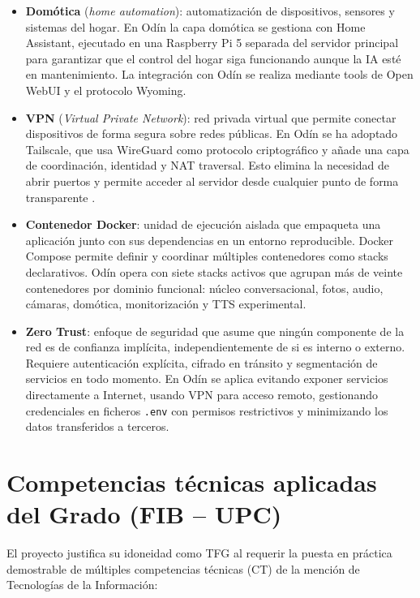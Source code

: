 \begin{itemize}
  \item \textbf{Domótica} (\textit{home automation}): automatización de dispositivos, sensores y sistemas del hogar. En Odín la capa domótica se gestiona con Home Assistant, ejecutado en una Raspberry Pi 5 separada del servidor principal para garantizar que el control del hogar siga funcionando aunque la IA esté en mantenimiento. La integración con Odín se realiza mediante tools de Open WebUI y el protocolo Wyoming.

  \item \textbf{VPN} (\textit{Virtual Private Network}): red privada virtual que permite conectar dispositivos de forma segura sobre redes públicas. En Odín se ha adoptado Tailscale, que usa WireGuard como protocolo criptográfico y añade una capa de coordinación, identidad y NAT traversal. Esto elimina la necesidad de abrir puertos y permite acceder al servidor desde cualquier punto de forma transparente \cite{wireguardWhitepaper}.

  \item \textbf{Contenedor Docker}: unidad de ejecución aislada que empaqueta una aplicación junto con sus dependencias en un entorno reproducible. Docker Compose permite definir y coordinar múltiples contenedores como stacks declarativos. Odín opera con siete stacks activos que agrupan más de veinte contenedores por dominio funcional: núcleo conversacional, fotos, audio, cámaras, domótica, monitorización y TTS experimental.

  \item \textbf{Zero Trust}: enfoque de seguridad que asume que ningún componente de la red es de confianza implícita, independientemente de si es interno o externo. Requiere autenticación explícita, cifrado en tránsito y segmentación de servicios en todo momento. En Odín se aplica evitando exponer servicios directamente a Internet, usando VPN para acceso remoto, gestionando credenciales en ficheros \texttt{.env} con permisos restrictivos y minimizando los datos transferidos a terceros.

\end{itemize}


\section{Competencias técnicas aplicadas del Grado (FIB -- UPC)}
El proyecto justifica su idoneidad como TFG al requerir la puesta en práctica demostrable de múltiples competencias técnicas (CT) de la mención de Tecnologías de la Información:


